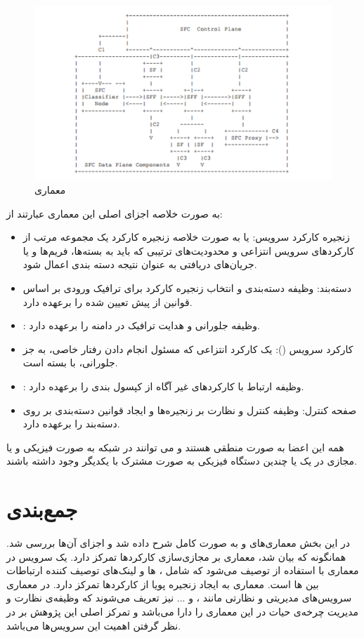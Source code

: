 \begin{figure}[h!]
\center\includegraphics[scale=.5]{images/sfc}
\caption{معماری }
\label{fig.22}
\end{figure}

به صورت خلاصه اجزای اصلی این معماری عبارتند از:
\begin{itemize}
    \item زنجیره کارکرد سرویس: یا به صورت خلاصه زنجیره کارکرد یک مجموعه مرتب از کارکردهای سرویس انتزاعی و محدودیت‌های ترتیبی که باید به بسته‌ها، فریم‌ها و یا جریان‌های دریافتی به عنوان نتیجه دسته بندی اعمال شود.
    \item دسته‌بند: وظیفه دسته‌بندی و انتخاب زنجیره کارکرد برای ترافیک ورودی بر اساس قوانین از پیش تعیین شده را برعهده دارد.
    \item {}: وظیفه جلورانی و هدایت ترافیک در دامنه  را برعهده دارد.
    \item کارکرد سرویس (): یک کارکرد انتزاعی که مسئول انجام دادن رفتار خاصی، به جز جلورانی، با بسته است.
    \item {}: وظیفه ارتباط با کارکردهای غیر آگاه از کپسول بندی  را برعهده دارد.
    \item صفحه کنترل: وظیفه کنترل و نظارت بر زنجیره‌ها و ایجاد قوانین دسته‌بندی بر روی دسته‌بند را برعهده دارد.
\end{itemize}
همه این اعضا به صورت منطقی هستند و می توانند در شبکه به صورت فیزیکی و یا مجازی در یک یا چندین دستگاه فیزیکی به صورت مشترک با یکدیگر وجود داشته باشند.

\section{جمع‌بندی}
در این بخش معماری‌های  و  به صورت کامل شرح داده شد و اجزای آن‌ها بررسی شد.
همانگونه که بیان شد، معماری  بر مجازی‌سازی کارکردها تمرکز دارد.
یک سرویس در معماری  با استفاده از  توصیف می‌شود که
شامل ، ‌ها و لینک‌های توصیف کننده ارتباطات بین ‌ها است.
معماری  به ایجاد زنجیره پویا از کارکردها تمرکز دارد.
در معماری  سرویس‌های مدیریتی و نظارتی مانند ،  و ... نیز تعریف می‌شوند که
وظیفه‌ی نظارت و مدیریت چرخه‌ی حیات در این معماری را دارا می‌باشد و تمرکز اصلی این پژوهش بر در نظر گرفتن اهمیت این سرویس‌ها می‌باشد.

